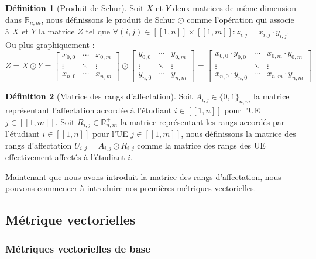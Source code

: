 \documentclass{rapport}
\theoremstyle{definition}
\newtheorem{definition}{Définition}
\theoremstyle{remark}
\theoremstyle{definition}
\theoremstyle{remark}
\newcommand{\llbracket}{[\![}
\newcommand{\rrbracket}{]\!]}
\begin{document}
\begin{definition}[Produit de Schur]
    Soit $X$ et $Y$ deux matrices de même dimension dans $\mathbb{R}_{n,m}$, nous définissons le produit de Schur $\odot$
    comme l'opération qui associe à $X$ et $Y$ la matrice $Z$ tel que $\forall (i,j)\in\llbracket 1,n\rrbracket\times\llbracket 1,m\rrbracket:z_{i,j}=x_{i,j}\cdot y_{i,j}$. Ou plus graphiquement :
    $$
    Z = X\odot Y = \begin{bmatrix}
        x_{0,0} & \cdots & x_{0,m} \\
        \vdots & \ddots & \vdots \\
        x_{n,0} & \cdots & x_{n,m}
    \end{bmatrix} \odot \begin{bmatrix}
        y_{0,0} & \cdots & y_{0,m} \\
        \vdots & \ddots & \vdots \\
        y_{n,0} & \cdots & y_{n,m}
    \end{bmatrix} = \begin{bmatrix}
        x_{0,0}\cdot y_{0,0} & \cdots & x_{0,m}\cdot y_{0,m} \\
        \vdots & \ddots & \vdots \\
        x_{n,0}\cdot y_{n,0} & \cdots & x_{n,m}\cdot y_{n,m}
    \end{bmatrix}
    $$
\end{definition}

\begin{definition}[Matrice des rangs d'affectation]
    Soit $A_{i,j}\in\{0,1\}_{n,m}$ la matrice représentant l'affectation accordée à l'étudiant $i\in\llbracket 1,n\rrbracket$ pour l'UE $j\in\llbracket 1,m\rrbracket$.
    Soit $R_{i,j}\in\mathbb{R}^{+}_{n,m}$ la matrice représentant les rangs accordés par l'étudiant $i\in\llbracket 1,n\rrbracket$ pour l'UE $j\in\llbracket 1,m\rrbracket$, nous
    définissons la matrice des rangs d'affectation $U_{i,j} = A_{i,j} \odot R_{i,j}$ comme la matrice des rangs des UE effectivement affectés à l'étudiant $i$.
\end{definition}

Maintenant que nous avons introduit la matrice des rangs d'affectation, nous pouvons commencer à introduire nos premières métriques vectorielles.

\subsection{Métrique vectorielles}
\subsubsection{Métriques vectorielles de base}
\end{document}

